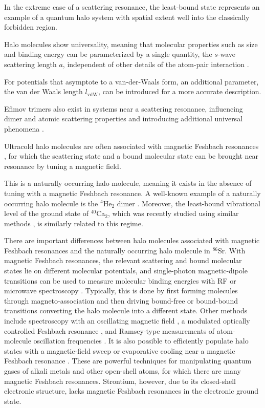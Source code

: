 In the extreme case of a scattering resonance, the least-bound state represents an example of a quantum halo system \cite{jrf04} with spatial extent well into the classically forbidden region. 

Halo molecules show universality, meaning that molecular properties such as size and binding energy can be parameterized by a single quantity, the $s$-wave scattering length $a$, independent of other details of the atom-pair interaction \cite{kgj06,bha06}. 

For potentials that asymptote to a van-der-Waals form, an additional parameter, the van der Waals length $l_{\mathrm{vdW}}$, can be introduced for a more accurate description. 

Efimov trimers also exist in systems near a scattering resonance, influencing dimer and atomic scattering properties and introducing additional universal phenomena \cite{bha07,nen17}. 

Ultracold halo molecules are often associated with magnetic Feshbach resonances \cite{cgj10}, for which the scattering state and a bound molecular state can be brought near resonance by tuning a magnetic field.

This is a naturally occurring halo molecule, meaning it exists in the absence of tuning with a magnetic Feshbach resonance. 
A well-known example of a naturally occurring halo molecule is the $^4$He$_2$ dimer \cite{lmk93,sto94,kgj06}.
Moreover, the least-bound vibrational level of the ground state of $^{40}$Ca$_2$, which was recently studied using similar methods \cite{Pachomow2017a}, is similarly related to this regime.

There are important differences between halo molecules associated with magnetic Feshbach resonances and the naturally occurring halo molecule in $^{86}$Sr. 
With magnetic Feshbach resonances, the relevant scattering and bound molecular states lie on different molecular potentials, and single-photon magnetic-dipole transitions can be used to measure molecular binding energies with RF or microwave spectroscopy \cite{cgj10,cju05,thw05b}. 
Typically, this is done by first forming molecules through magneto-association and then driving bound-free or bound-bound transitions converting the halo molecule into a different state.
Other methods include spectroscopy with an oscillating magnetic field \cite{thw05b}, a modulated optically controlled Feshbach resonance \cite{chx15}, and Ramsey-type measurements of atom-molecule oscillation frequencies \cite{ckt03}. 
It is also possible to efficiently populate halo states with a magnetic-field sweep \cite{grj03} or evaporative cooling \cite{jba03} near a magnetic Feshbach resonance \cite{cgj10}. 
These are powerful techniques for manipulating quantum gases of alkali metals and other open-shell atoms, for which there are many magnetic Feshbach resonances. 
Strontium, however, due to its closed-shell electronic structure, lacks magnetic Feshbach resonances in the electronic ground state.

